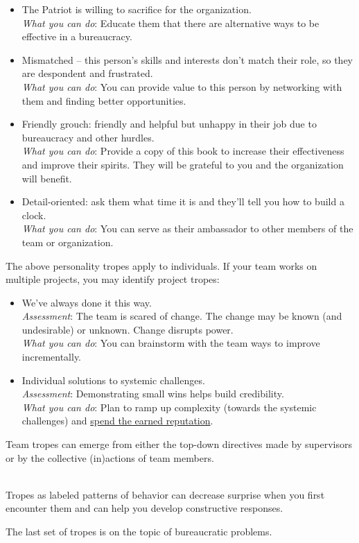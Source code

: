 \begin{itemize}
    \item The Patriot is willing to sacrifice for the organization. \\
    \textit{What you can do}: Educate them that there are alternative ways to be effective in a bureaucracy.
    
    \item Mismatched -- this person's skills and interests don't match their role, so they are despondent and frustrated. \\
    \textit{What you can do}: You can provide value to this person by networking with them and finding better opportunities.
    
    \item Friendly grouch: friendly and helpful but unhappy in their job due to bureaucracy and other hurdles. \\
    \textit{What you can do}: Provide a copy of this book to increase their effectiveness and improve their spirits. They will be grateful to you and the organization will benefit.
    
    \item Detail-oriented: ask them what time it is and they'll tell you how to build a clock. \\
    \textit{What you can do}: You can serve as their ambassador to other members of the team or organization.  
\end{itemize}


The above personality tropes apply to individuals. If your team works on multiple projects, you may identify project tropes:
\begin{itemize}
    \item We've always done it this way.\\
    \textit{Assessment}: The team is scared of change. The change may be known (and undesirable) or unknown. Change disrupts power.\\
    \textit{What you can do}: You can brainstorm with the team ways to improve incrementally. 

    \item Individual solutions to systemic challenges.\\
    \textit{Assessment}: Demonstrating small wins helps build credibility. \\
    \textit{What you can do}: Plan to ramp up  complexity (towards the systemic challenges) and \hyperref[sec:reputation]{spend the earned reputation}.
\end{itemize}
Team tropes can emerge from either the top-down directives made by supervisors or by the collective (in)actions of team members.


\ \\


Tropes as labeled patterns of behavior can decrease surprise when you first encounter them and can help you develop constructive responses. 

The last set of tropes is on the topic of bureaucratic problems. 